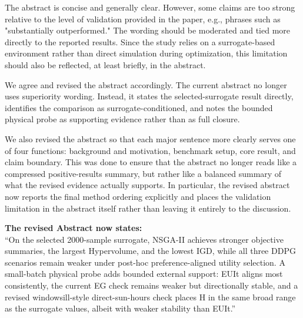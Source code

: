\begin{ReviewerComment}
The abstract is concise and generally clear. However, some claims are too strong relative to the level of validation provided in the paper, e.g., phrases such as "substantially outperformed." The wording should be moderated and tied more directly to the reported results. Since the study relies on a surrogate-based environment rather than direct simulation during optimization, this limitation should also be reflected, at least briefly, in the abstract.
\end{ReviewerComment}
%
\begin{Answer}
We agree and revised the abstract accordingly. The current abstract no longer uses superiority wording. Instead, it states the selected-surrogate result directly, identifies the comparison as surrogate-conditioned, and notes the bounded physical probe as supporting evidence rather than as full closure.

We also revised the abstract so that each major sentence more clearly serves one of four functions: background and motivation, benchmark setup, core result, and claim boundary. This was done to ensure that the abstract no longer reads like a compressed positive-results summary, but rather like a balanced summary of what the revised evidence actually supports. In particular, the revised abstract now reports the final method ordering explicitly and places the validation limitation in the abstract itself rather than leaving it entirely to the discussion.
\end{Answer}
\begin{RevisionExcerpt}
\noindent\textbf{The revised Abstract now states:}\\
``On the selected 2000-sample surrogate, NSGA-II achieves stronger objective summaries, the largest Hypervolume, and the lowest IGD, while all three DDPG scenarios remain weaker under post-hoc preference-aligned utility selection. A small-batch physical probe adds bounded external support: EUIt aligns most consistently, the current EG check remains weaker but directionally stable, and a revised windowsill-style direct-sun-hours check places H in the same broad range as the surrogate values, albeit with weaker stability than EUIt.''
\end{RevisionExcerpt}

